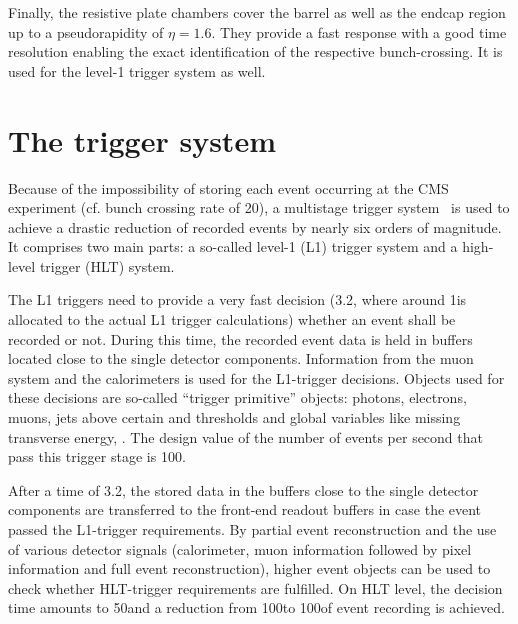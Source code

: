 Finally, the resistive plate chambers cover the barrel as well as the endcap region up to a pseudorapidity of $\eta=1.6$. 
They provide a fast response with a good time resolution enabling the exact identification of the respective bunch-crossing.
It is used for the level-1 trigger system as well.
\section{The trigger system}
\label{sec:TriggerSystem}
Because of the impossibility of storing each event occurring at the CMS experiment (cf. bunch crossing rate of 20\mhz), a multistage trigger system~\cite{bib:CMS:TDR_2006} is used to achieve a drastic reduction of recorded events by nearly six orders of magnitude.
It comprises two main parts: a so-called level-1 (L1) trigger system and a high-level trigger (HLT) system.

The L1 triggers need to provide a very fast decision (3.2\mus, where around 1\mus is allocated to the actual L1 trigger calculations) whether an event shall be recorded or not.
During this time, the recorded event data is held in buffers located close to the single detector components.
Information from the muon system and the calorimeters is used for the L1-trigger decisions.
Objects used for these decisions are so-called ``trigger primitive'' objects: photons, electrons, muons, jets above certain \et and \pt thresholds and global variables like missing transverse energy, \met. 
The design value of the number of events per second that pass this trigger stage is 100\khz.

After a time of 3.2\mus, the stored data in the buffers close to the single detector components are transferred to the front-end readout buffers in case the event passed the L1-trigger requirements.
By partial event reconstruction and the use of various detector signals (calorimeter, muon information followed by pixel information and full event reconstruction), higher event objects can be used to check whether HLT-trigger requirements are fulfilled.
On HLT level, the decision time amounts to 50\ms and a reduction from 100\khz to 100\hz of event recording is achieved.

\FloatBarrier
